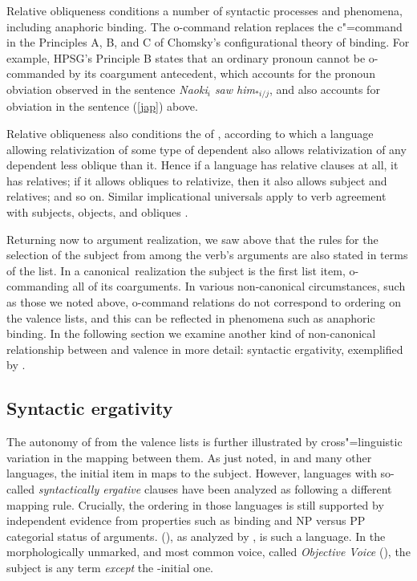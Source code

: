 \documentclass[output=paper
 	        ,biblatex
                ,babelshorthands
                ,newtxmath
                ,draftmode
                ,colorlinks, citecolor=brown
]{langscibook}
\begin{document}
Relative obliqueness conditions a number of syntactic processes and phenomena, including anaphoric
binding.  The o-command relation replaces the c"=command in the Principles A, B, and C of Chomsky's
\citeyearpar{Chomsky:1981} configurational theory of binding.  For example, HPSG's Principle B
states that an ordinary pronoun cannot be o-commanded by its coargument antecedent, which accounts
for the pronoun obviation observed in the  sentence \textit{Naoki$_i$ saw
  him$_{*i/j}$}, and also accounts for obviation in the  sentence (\ref{jap}) above.

Relative obliqueness also conditions the  of
\citet{KeenanandComrie1977}, according to which a language allowing relativization of some type of
dependent also allows relativization of any dependent less oblique than it.  Hence if a language has relative
clauses at all, it has  relatives; if it allows obliques to relativize, then it also allows
subject and  relatives; and so on. Similar implicational universals apply to verb agreement
with subjects, objects, and obliques \citep{greenberg:1966}. 

Returning now to argument realization, we saw above that the rules for the selection of the subject
from among the verb's arguments are also stated in terms of the \argst list.  In a canonical\
realization the subject is the first list item, o-commanding all of its coarguments.
In various non-canonical circumstances, such as those we noted above, o-command relations do not
correspond to ordering on the valence lists, and this can be reflected in phenomena such as
anaphoric binding.  In the following section we examine another kind of non-canonical relationship
between \argst and valence in more detail: syntactic ergativity, exemplified by \ili{Balinese}.

\subsection{Syntactic ergativity}
\label{ergativity}\label{arg-st-sec-ergativity}

The autonomy of \argst from the valence lists is further illustrated by
cross"=linguistic variation in the mapping between them.  As just noted, in \ili{English} and many
other languages, the initial item in \argst maps to the subject.  However, languages with so-called
\emph{syntactically ergative} clauses have been analyzed as following a different mapping rule.
Crucially, the \argst ordering in those languages is still supported by independent evidence from
properties such as binding and NP versus PP categorial status of arguments.  \ili{Balinese}
(\ili{Austronesian}), as analyzed by \citet{Wechsler+Arka:1998}, is such a language.  In the
morphologically unmarked, and most common voice, called \emph{Objective Voice}
(\feat{ov}), the subject is any term \textit{except} the \argst-initial one.
\end{document}
